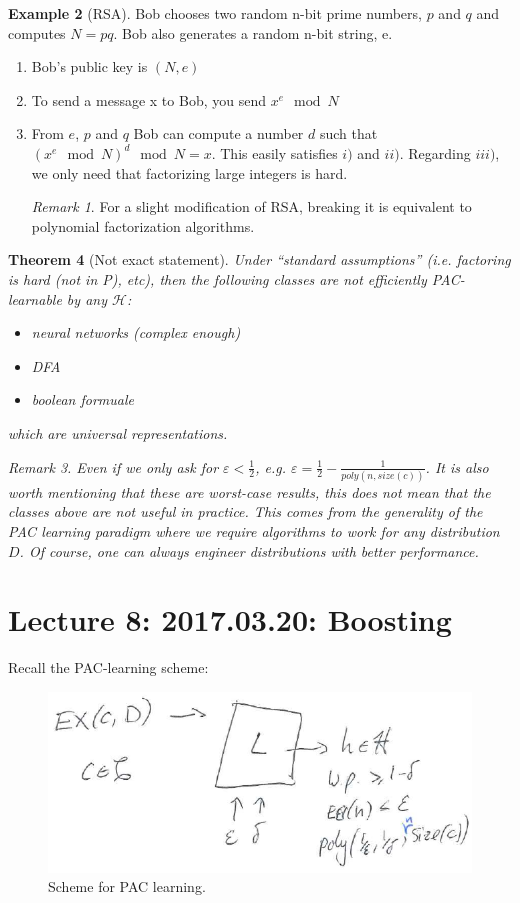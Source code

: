 \documentclass[12pt, letterpaper]{article}
\numberwithin{equation}{section} %
\newcommand{\mc}{\mathcal}
\newcommand{\ve}{\varepsilon}
\newtheorem{theorem}{Theorem}[section]
\theoremstyle{definition}
\newtheorem{example}[theorem]{Example}
\theoremstyle{remark}
\newtheorem{remark}[theorem]{Remark}
\begin{document}
\begin{example}[RSA]
Bob chooses two random n-bit prime numbers, $p$ and $q$ and computes $N=pq$. Bob also generates a random n-bit string, e.
\begin{enumerate}
\item Bob's public key is $(N, e)$
\item To send a message x to Bob, you send $x^e\mod N$
\item From $e$, $p$ and $q$ Bob can compute a number $d$ such that $(x^e \mod N)^d \mod N = x$.
This easily satisfies $i)$ and $ii)$. Regarding $iii)$, we only need that factorizing large integers is hard.
\begin{remark}
For a slight modification of RSA, breaking it is equivalent to polynomial factorization algorithms.
\end{remark}
\end{enumerate}
\end{example}

\begin{theorem}[Not exact statement]
Under ``standard assumptions'' (i.e. factoring is hard (not in P), etc), then the following classes are not efficiently PAC-learnable by \emph{any} $\mc H$:
\begin{itemize}
\item neural networks (complex enough)
\item DFA
\item boolean formuale
\end{itemize}
which are universal representations.
\begin{remark}
Even if we only  ask for $\ve < \frac12$, e.g. $\ve = \frac12 - \frac1{poly(n, size(c))}$. It is also worth mentioning that these are worst-case results, this does not mean that the classes above are not useful in practice. This comes from the generality of the PAC learning paradigm where we require algorithms to work for any distribution $D$. Of course, one can always engineer distributions with better performance.
\end{remark}
\end{theorem}

\section{Lecture 8: 2017.03.20: Boosting}
Recall the PAC-learning scheme:
\begin{figure}[H]
\centering
\includegraphics[width=0.6\linewidth]{../img/pac-learning.png}
\caption{Scheme for PAC learning.}
\end{figure}
\end{document}

